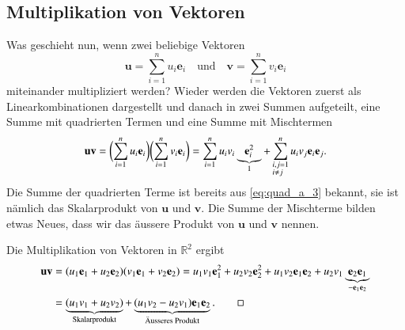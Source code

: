 \subsection{Multiplikation von Vektoren}
Was geschieht nun, wenn zwei beliebige Vektoren
\begin{equation*}
    \textbf{u} = 
    \sum_{i=1}^{n} u_i \textbf{e}_i 
    \quad
    \text{und}
    \quad
    \textbf{v} = \sum_{i=1}^{n} v_i \textbf{e}_i
\end{equation*}
 miteinander multipliziert werden? 
 Wieder werden die Vektoren zuerst als Linearkombinationen dargestellt und danach in zwei Summen aufgeteilt,
eine Summe mit quadrierten Termen und eine Summe mit Mischtermen
\begin{equation}
        \textbf{u}\textbf{v} 
        =
        \biggl( 
        \sum_{i=1}^{n} u_i \textbf{e}_i
        \biggr) 
        \biggl( 
        \sum_{i=1}^{n} v_i \textbf{e}_i
        \biggr) 
        = 
        \sum_{i=1}^n u_iv_i\underbrace{\textbf{e}_i^2}_{1} 
        + \sum_{\begin{subarray}{l}i,j=1\\i \neq j\end{subarray}}^n  u_iv_j\textbf{e}_i\textbf{e}_j.
\end{equation}
Die Summe der quadrierten Terme ist bereits aus \eqref{eq:quad_a_3} bekannt,
sie ist nämlich das Skalarprodukt von $\textbf{u}$ und $\textbf{v}$.
Die Summe der Mischterme bilden etwas Neues, dass wir das äussere Produkt von $\textbf{u}$ und $\textbf{v}$ nennen.
\begin{beispiel}
    Die Multiplikation von Vektoren in $\mathbb{R}^2$ ergibt
\begin{align*}
        \textbf{u}\textbf{v} 
        &= 
        (u_1\textbf{e}_1 + u_2\textbf{e}_2)(v_1\textbf{e}_1 + v_2\textbf{e}_2) 
        = 
        u_1v_1\textbf{e}_1^2
        + 
        u_2v_2\textbf{e}_2^2 
        + 
        u_1v_2\textbf{e}_1\textbf{e}_2 
        +  
        u_2v_1\underbrace{\textbf{e}_2\textbf{e}_1}_{-\textbf{e}_1\textbf{e}_2}
        \\\ 
        &=  
        \underbrace{(u_1v_1 + u_2v_2)}_{\text{Skalarprodukt}} 
        + 
        \underbrace{(u_1v_2 - u_2v_1)\textbf{e}_1\textbf{e}_2}_{\text{Äusseres Produkt}}.
\qedhere
\end{align*}
\end{beispiel}
